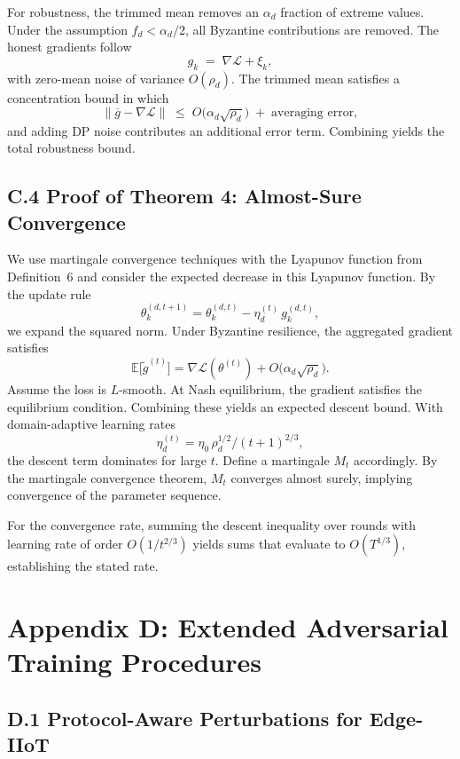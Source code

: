 \documentclass[12pt,a4paper]{article}
\theoremstyle{definition}
\begin{document}
For robustness, the trimmed mean removes an \(\alpha_d\) fraction of extreme values. Under the assumption \(f_d < \alpha_d/2\), all Byzantine contributions are removed. The honest gradients follow
\[
g_k \;=\; \nabla \mathcal{L} + \xi_k,
\]
with zero-mean noise of variance \(O(\rho_d)\). The trimmed mean satisfies a concentration bound in which
\[
\big\|\overline{g}-\nabla \mathcal{L}\big\|
\;\le\; O\!\big(\alpha_d \sqrt{\rho_d}\big)\;+\;\text{averaging error},
\]
and adding DP noise contributes an additional error term. Combining yields the total robustness bound.

\endgroup

\subsection{C.4 Proof of Theorem 4: Almost-Sure Convergence}

\begingroup
\setlength{\emergencystretch}{2em}

We use martingale convergence techniques with the Lyapunov function from Definition~6 and consider the expected decrease in this Lyapunov function. By the update rule
\[
\theta_{k}^{(d,t+1)}=\theta_{k}^{(d,t)}-\eta_{d}^{(t)}\,g_{k}^{(d,t)},
\]
we expand the squared norm. Under Byzantine resilience, the aggregated gradient satisfies
\[
\mathbb{E}\big[\tilde g^{(t)}\big]
= \nabla \mathcal{L}\!\left(\theta^{(t)}\right)
+ O\!\big(\alpha_{d}\sqrt{\rho_{d}}\big).
\]
Assume the loss is \(L\)-smooth. At Nash equilibrium, the gradient satisfies the equilibrium condition. Combining these yields an expected descent bound. With domain-adaptive learning rates
\[
\eta_{d}^{(t)}=\eta_{0}\,\rho_{d}^{1/2}/(t+1)^{2/3},
\]
the descent term dominates for large \(t\). Define a martingale \(M_{t}\) accordingly. By the martingale convergence theorem, \(M_{t}\) converges almost surely, implying convergence of the parameter sequence.

\par\endgroup


For the convergence rate, summing the descent inequality over rounds with learning rate of order $O(1/t^{2/3})$ yields sums that evaluate to $O(T^{1/3})$, establishing the stated rate.

\section{Appendix D: Extended Adversarial Training Procedures}

\subsection{D.1 Protocol-Aware Perturbations for Edge-IIoT}
\end{document}
